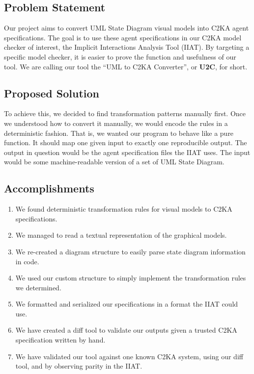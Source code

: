 \subsection{Problem Statement}\label{subsec:problem-statement}
Our project aims to convert UML State Diagram visual models into C2KA agent specifications.
The goal is to use these agent specifications in our C2KA model checker of interest, the Implicit Interactions Analysis Tool (IIAT).
By targeting a specific model checker, it is easier to prove the function and usefulness of our tool.
We are calling our tool the ``UML to C2KA Converter'', or \textbf{U2C}, for short.

\subsection{Proposed Solution}\label{subsec:proposed-solution}
To achieve this, we decided to find transformation patterns manually first.
Once we understood how to convert it manually, we would encode the rules in a deterministic fashion.
That is, we wanted our program to behave like a pure function.
It should map one given input to exactly one reproducible output.
The output in question would be the agent specification files the IIAT uses.
The input would be some machine-readable version of a set of UML State Diagram.

\subsection{Accomplishments}\label{subsec:accomplishments}
\begin{enumerate}
    \item We found deterministic transformation rules for visual models
    to C2KA specifications.
    \item We managed to read a textual representation of the graphical models.
    \item We re-created a diagram structure to easily parse state diagram information in code.
    \item We used our custom structure to simply implement the transformation rules we determined.
    \item We formatted and serialized our specifications in a format the IIAT could use.
    \item We have created a diff tool to validate our outputs given a trusted C2KA specification written by hand.
    \item We have validated our tool against one known C2KA system, using our diff tool, and by observing parity in the IIAT\@.
\end{enumerate}

